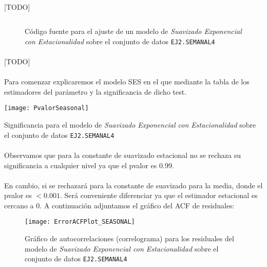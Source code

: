 \documentclass[a4paper, spanish]{article}
\begin{document}
      \paragraph{}
      [TODO]

      \begin{figure}[htb!]
        \centering
        \inputminted{SAS}{./res/code/b-01-esm-seasonal.sas}
        \caption{Código fuente para el ajuste de un modelo de \emph{Suavizado Exponencial con Estacionalidad} sobre el conjunto de datos \texttt{EJ2.SEMANAL4}}
        \label{code:b_seasonal_esm}
      \end{figure}

      \paragraph{}
      [TODO]

      \paragraph{}
      Para comenzar explicaremos el modelo SES en el que mediante la tabla de los estimadores del parámetro y la significancia de dicho test.

      \begin{table}[htb!]
        \centering
        \texttt{[image: PvalorSeasonal]}
        \caption{Significancia para el modelo de \emph{Suavizado Exponencial con Estacionalidad} sobre el conjunto de datos \texttt{EJ2.SEMANAL4}}
        \label{table:b_seasonal_significance}
      \end{table}

      \paragraph{}
      Observamos que para la constante de suavizado estacional no se rechaza su significancia a cualquier nivel ya que el pvalor es 0.99.

      \paragraph{}
      En cambio, si se rechazará para la constante de suavizado para la media, donde el pvalor es $<0.001$. Será conveniente diferenciar ya que el estimador estacional es cercano a 0. A continuación adjuntamos el gráfico del ACF de residuales:

      \begin{figure}[htb!]
        \centering
        \texttt{[image: ErrorACFPlot\_SEASONAL]}
        \caption{Gráfico de autocorrelaciones (correlograma) para los residuales del modelo de \emph{Suavizado Exponencial con Estacionalidad} sobre el conjunto de datos \texttt{EJ2.SEMANAL4}}
        \label{img:b_seasonal_residuals_correlogram}
      \end{figure}
\end{document}
